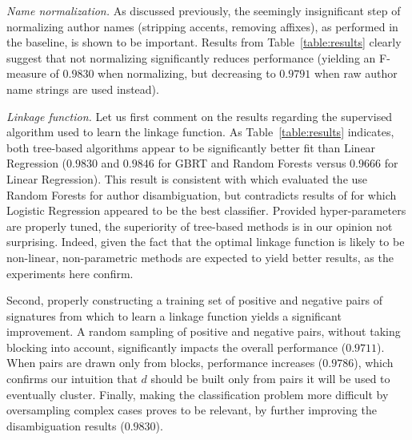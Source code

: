 \documentclass{article}
\begin{document}
\textit{Name normalization.} As discussed previously, the seemingly insignificant step of
normalizing author names (stripping accents, removing affixes), as performed in the
baseline, is shown to be important. Results from Table~\ref{table:results} clearly suggest that not
normalizing significantly reduces performance (yielding an F-measure of $0.9830$ when normalizing,
but decreasing to $0.9791$ when raw author name strings are used instead).

\textit{Linkage function.} Let us first comment on the results regarding the
supervised algorithm used to learn the linkage function.
As Table~\ref{table:results} indicates, both tree-based algorithms appear to be
significantly better fit than Linear Regression ($0.9830$ and $0.9846$ for GBRT
and Random Forests versus $0.9666$ for Linear Regression). This result is
consistent with \citep{treeratpituk2009disambiguating} which evaluated the use
Random Forests for author disambiguation, but contradicts results of
\citep{levin2012citation} for which Logistic Regression appeared to be the best
classifier.
Provided hyper-parameters are properly tuned, the superiority of
tree-based methods is in our opinion not surprising.
Indeed, given the fact that the optimal linkage function is likely to be non-linear, non-parametric
methods are expected to yield better results, as the experiments here confirm.

Second, properly constructing a training set of positive and negative pairs of
signatures from which to learn a linkage function yields a significant
improvement.
A random sampling of positive and negative pairs, without taking
blocking into account, significantly impacts the overall performance
($0.9711$). When pairs are drawn only from blocks, performance increases
($0.9786$), which confirms our intuition that $d$ should be built only from
pairs it will be used to eventually cluster. Finally, making the classification
problem more difficult by oversampling complex cases proves to be relevant,
by further improving the disambiguation results ($0.9830$).
\end{document}
